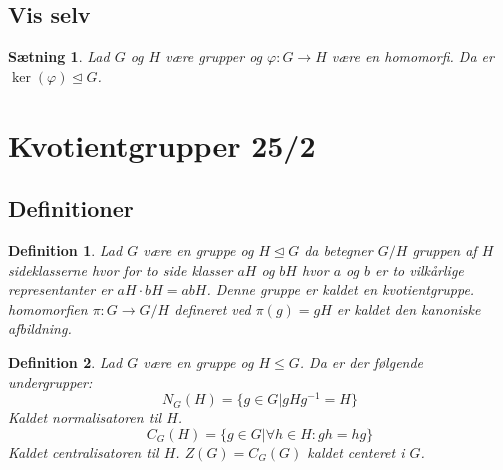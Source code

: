 \documentclass{article}
\newcommand{\inv}{^{-1}}
\newcommand{\too}{\rightarrow}
\newtheorem{setn}{Sætning}
\newtheorem{defi}{Definition}
\begin{document}
		\subsection*{Vis selv}
		\begin{setn}
			Lad $G$ og $H$ være grupper og $\varphi: G \too H$ være en homomorfi.
			Da er $\ker(\varphi) \unlhd G$.
		\end{setn}
	\newpage
	\section*{Kvotientgrupper 25/2}
		\subsection*{Definitioner}
		\begin{defi}
			Lad $G$ være en gruppe og $H \unlhd G$ da betegner $G/H$ gruppen
			af $H$ sideklasserne hvor for to side klasser $aH$ og $bH$ hvor $a$ og $b$
			er to vilkårlige representanter er $aH\cdot bH = abH$. Denne gruppe er kaldet
			en kvotientgruppe.
			homomorfien $\pi: G \too G/H$ defineret ved $\pi(g) = gH$ er kaldet
			den kanoniske afbildning.
		\end{defi}
		\begin{defi}
			Lad $G$ være en gruppe og $H \le G$. Da er der følgende undergrupper:
			$$N_G(H) = \{g \in G| gHg\inv = H\}$$
			Kaldet normalisatoren til $H$.
			$$C_G(H) = \{g \in G| \forall h \in H: gh = hg\}$$
			Kaldet centralisatoren til $H$.
			$Z(G) = C_G(G)$ kaldet centeret i $G$.
		\end{defi}
\end{document}
